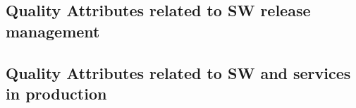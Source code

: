 \subsection{Quality Attributes related to SW release management}

\subsection{Quality Attributes related to SW and services in production}









